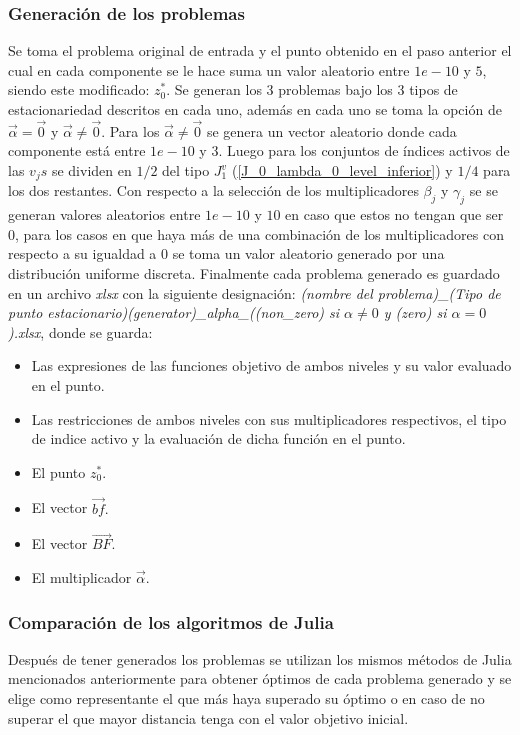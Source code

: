 \subsubsection{Generación de los problemas}
Se toma el problema original de entrada y el punto obtenido en el paso anterior el cual en cada componente se le hace suma un
valor aleatorio entre $1e-10$ y $5$, siendo este modificado: $z^*_0$. 
Se generan los 3 problemas bajo los 3 tipos de estacionariedad descritos en cada uno, 
además en cada uno se toma la opción de $\vec{\alpha}=\vec{0}$ y $\vec{\alpha}\ne \vec{0}$.
Para los $\vec{\alpha}\neq \vec{0}$ se genera un vector aleatorio donde cada componente está entre $1e-10$ y $3$.
Luego para los conjuntos de índices activos de las $v_{j}s$ se dividen en $1/2$ del tipo $J_1^v$ (\ref{J_0_lambda_0_level_inferior}) y $1/4$ para los dos restantes.
Con respecto a la selección de los multiplicadores $\beta_j$ y $\gamma_j$ se 
se generan valores aleatorios entre $1e-10$ y $10$ en caso que estos no tengan que ser $0$, 
para los casos en que haya más de una combinación de los multiplicadores con respecto a su igualdad a $0$
se toma un valor aleatorio generado por una distribución uniforme discreta.
Finalmente cada problema generado es guardado en un archivo \textit{xlsx} con la siguiente designación:
\textit{(nombre del problema)\_(Tipo de punto estacionario)(generator)\_alpha\_((non\_zero) si $\alpha \neq 0$ y (zero) si $\alpha = 0$).xlsx},
donde se guarda: 
\begin{itemize}
    \item Las expresiones de las funciones objetivo de ambos niveles y su valor evaluado en el punto.
    \item Las restricciones de ambos niveles con sus multiplicadores respectivos, el tipo de indice activo y la evaluación de dicha función en el punto.
    \item El punto $z^*_0$.
    \item El vector $\vec{bf}.$
    \item El vector $\vec{BF}$.
    \item El multiplicador $\vec{\alpha}$.
\end{itemize}

\subsubsection{Comparación de los algoritmos de Julia}
Después de tener generados los problemas se utilizan los mismos métodos de Julia mencionados anteriormente
para obtener óptimos de cada problema generado y se elige como representante el que más haya superado su óptimo o en caso de no superar el que mayor distancia tenga con el valor objetivo inicial.

